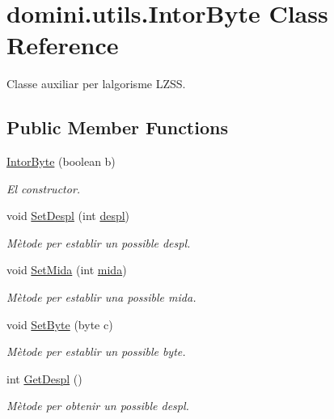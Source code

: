 \hypertarget{classdomini_1_1utils_1_1IntorByte}{}\section{domini.\+utils.\+Intor\+Byte Class Reference}
\label{classdomini_1_1utils_1_1IntorByte}


Classe auxiliar per l\textquotesingle{}algorisme L\+Z\+SS.  


\subsection*{Public Member Functions}
\begin{DoxyCompactItemize}
\item 
\hyperlink{classdomini_1_1utils_1_1IntorByte_ac2bae675cf6c4d8880acedeefaf24060}{Intor\+Byte} (boolean b)
\begin{DoxyCompactList}\small\item\em El constructor. \end{DoxyCompactList}\item 
void \hyperlink{classdomini_1_1utils_1_1IntorByte_a01c26f8a3a94b2bc31fda2f5989fca00}{Set\+Despl} (int \hyperlink{classdomini_1_1utils_1_1IntorByte_a83872b8acc9ab187acbc2175d5bf320e}{despl})
\begin{DoxyCompactList}\small\item\em Mètode per establir un possible despl. \end{DoxyCompactList}\item 
void \hyperlink{classdomini_1_1utils_1_1IntorByte_a2371fca6d26baf4098466dbb3089052d}{Set\+Mida} (int \hyperlink{classdomini_1_1utils_1_1IntorByte_a6dd2ad21efcfb2bcfff716f5e04794d9}{mida})
\begin{DoxyCompactList}\small\item\em Mètode per establir una possible mida. \end{DoxyCompactList}\item 
void \hyperlink{classdomini_1_1utils_1_1IntorByte_a02677743722d43ce96904e03eb82f25b}{Set\+Byte} (byte c)
\begin{DoxyCompactList}\small\item\em Mètode per establir un possible byte. \end{DoxyCompactList}\item 
int \hyperlink{classdomini_1_1utils_1_1IntorByte_a5d99bc2397d586c3e3319eadf7f23e4d}{Get\+Despl} ()
\begin{DoxyCompactList}\small\item\em Mètode per obtenir un possible despl. \end{DoxyCompactList}\item 

\end{DoxyCompactItemize}
